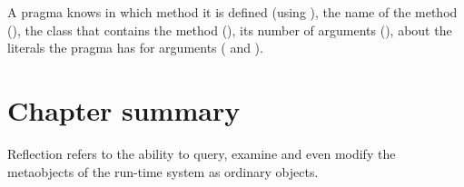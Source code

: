 \documentclass[a4paper,10pt,twoside]{book}
\begin{document}
A pragma knows in which method it is defined (using ), the name of the method (), the class that contains the method (), its number of arguments (), about the literals the pragma has for arguments ( and ). 


\section{Chapter summary}

Reflection refers to the ability to query, examine and even modify the metaobjects of the run-time system as ordinary objects.
\end{document}
